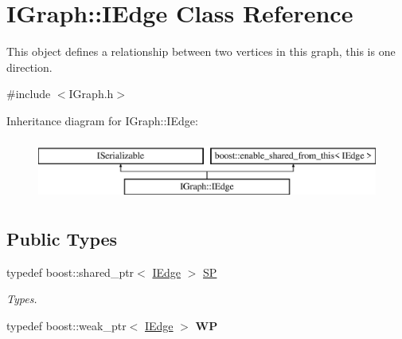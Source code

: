 \hypertarget{class_i_graph_1_1_i_edge}{}\section{I\+Graph\+:\+:I\+Edge Class Reference}
\label{class_i_graph_1_1_i_edge}


This object defines a relationship between two vertices in this graph, this is one direction.  




{\ttfamily \#include $<$I\+Graph.\+h$>$}

Inheritance diagram for I\+Graph\+:\+:I\+Edge\+:\begin{figure}[H]
\begin{center}
\leavevmode
\includegraphics[height=2.000000cm]{class_i_graph_1_1_i_edge}
\end{center}
\end{figure}
\subsection*{Public Types}
\begin{DoxyCompactItemize}
\item 
\mbox{\label{class_i_graph_1_1_i_edge_adfae3ec3e377543685a06b9c5d5a776a}} 
typedef boost\+::shared\+\_\+ptr$<$ \hyperlink{class_i_graph_1_1_i_edge}{I\+Edge} $>$ \hyperlink{class_i_graph_1_1_i_edge_adfae3ec3e377543685a06b9c5d5a776a}{SP}
\begin{DoxyCompactList}\small\item\em Types. \end{DoxyCompactList}\item 
\mbox{\label{class_i_graph_1_1_i_edge_ab49139a63801731e2c3fcff7ab1edd26}} 
typedef boost\+::weak\+\_\+ptr$<$ \hyperlink{class_i_graph_1_1_i_edge}{I\+Edge} $>$ {\bfseries WP}
\end{DoxyCompactItemize}
